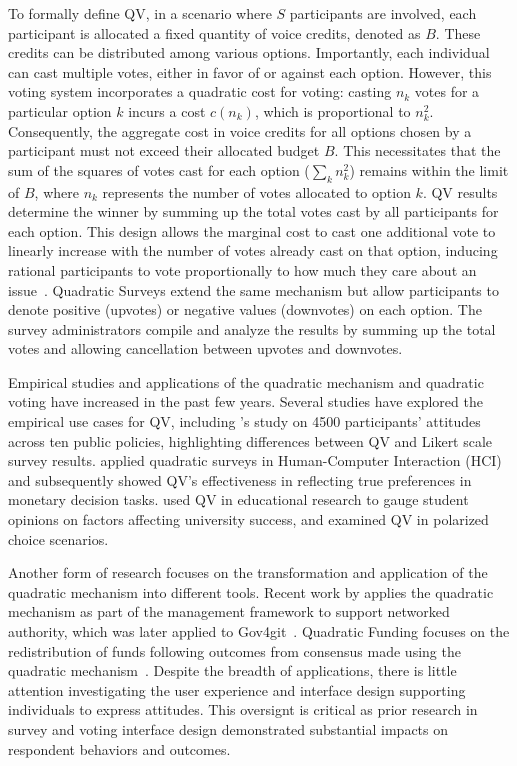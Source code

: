 To formally define QV, in a scenario where $S$ participants are involved, each participant is allocated a fixed quantity of voice credits, denoted as $B$. These credits can be distributed among various options. Importantly, each individual can cast multiple votes, either in favor of or against each option. However, this voting system incorporates a quadratic cost for voting: casting $n_k$ votes for a particular option $k$ incurs a cost $c(n_k)$, which is proportional to $n_k^2$. Consequently, the aggregate cost in voice credits for all options chosen by a participant must not exceed their allocated budget $B$. This necessitates that the sum of the squares of votes cast for each option ($\sum_k n_k^2$) remains within the limit of $B$, where $n_k$ represents the number of votes allocated to option $k$. QV results determine the winner by summing up the total votes cast by all participants for each option. This design allows the marginal cost to cast one additional vote to linearly increase with the number of votes already cast on that option, inducing rational participants to vote proportionally to how much they care about an issue~\cite{posner2018radical}. Quadratic Surveys extend the same mechanism but allow participants to denote positive (upvotes) or negative values (downvotes) on each option. The survey administrators compile and analyze the results by summing up the total votes and allowing cancellation between upvotes and downvotes.

Empirical studies and applications of the quadratic mechanism and quadratic voting have increased in the past few years. Several studies have explored the empirical use cases for QV, including \textcite{quarfoot2017quadratic}'s study on 4500 participants' attitudes across ten public policies, highlighting differences between QV and Likert scale survey results. \textcite{chengCanShowWhat2021} applied quadratic surveys in Human-Computer Interaction (HCI) and subsequently showed QV's effectiveness in reflecting true preferences in monetary decision tasks. \textcite{naylor2017first} used QV in educational research to gauge student opinions on factors affecting university success, and \textcite{cavailleWhoCaresMeasuring} examined QV in polarized choice scenarios.

Another form of research focuses on the transformation and application of the quadratic mechanism into different tools. Recent work by \textcite{southPluralManagement2024} applies the quadratic mechanism as part of the management framework to support networked authority, which was later applied to Gov4git~\cite{Gov4gitDecentralizedPlatform2023}. Quadratic Funding focuses on the redistribution of funds following outcomes from consensus made using the quadratic mechanism~\cite{buterinFlexibleDesignFunding2019a, freitasQuadraticFundingIncomplete2024}. Despite the breadth of applications, there is little attention investigating the user experience and interface design supporting individuals to express attitudes. This oversignt is critical as prior research in survey and voting interface design demonstrated substantial impacts on respondent behaviors and outcomes.

